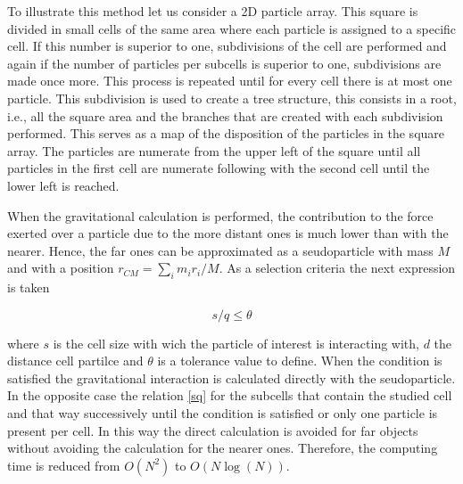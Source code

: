 \begin{enumerate}
To illustrate this method let us consider a 2D particle array. 
This square is divided in small cells of the same area where
each particle is assigned to a specific cell. 
If this number is superior to one, subdivisions of the cell
are performed and again if the number of particles per subcells 
is superior to one, subdivisions are made once more. This
process is repeated until for every cell there is at most
one particle. 
This subdivision is used to create a tree structure, this consists
in a root, i.e., all the square area and the branches that are 
created with each subdivision performed. This serves as a map
of the disposition of the particles in the square array. 
The particles are numerate from the upper left of the square 
until all particles in the first cell are numerate following with
the second cell until the lower left is reached. 

When the gravitational calculation is performed, the contribution 
to the force exerted over a particle due to the more distant ones
is much lower than with the nearer. Hence, the far ones can be 
approximated as a seudoparticle with mass $M$ and with a position
$r_{CM}=\sum_im_ir_i/M$. As a selection criteria the next expression
is taken

\begin{equation}
s/q\leq \theta
\label{sq}
\end{equation}

where $s$ is the cell size with wich the particle of interest is interacting 
with, $d$ the distance cell partilce and $\theta$ is a tolerance value to
define. When the condition is satisfied the gravitational interaction 
is calculated directly with the seudoparticle. In the opposite case the 
relation \ref{sq} for the subcells that contain the studied cell and that way
successively until the condition is satisfied or only one particle is 
present per cell. In this way the direct calculation is avoided for far
objects without avoiding the calculation for the nearer ones. 
Therefore, the computing time is reduced from $O(N^2)$ to $O(N\log(N))$.


\end{enumerate}
